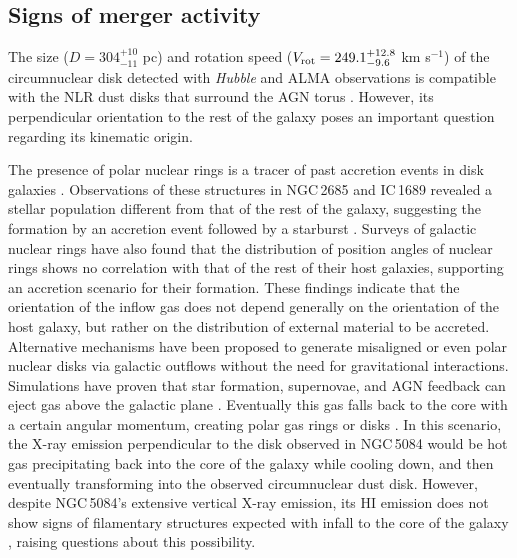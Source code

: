 \documentclass[modern]{CORE-AAS/aastex631}
\begin{document}
\subsection{Signs of merger activity}
\label{subsec:discussion_merger}
The size ($D=304^{+10}_{-11}$ pc) and rotation speed ($V_{\rm rot} = 249.1^{+12.8}_{-9.6}$ km s$^{-1}$) of the circumnuclear disk detected with \emph{Hubble} and ALMA observations is compatible with the NLR dust disks that surround the AGN torus \citep[][]{ramosalmeida+2017nat1_679}. However, its perpendicular orientation to the rest of the galaxy poses an important question regarding its kinematic origin. \par 
{}
The presence of polar nuclear rings is a tracer of past accretion events in disk galaxies \citep{anantharamaiah+1996apj466_13}. Observations of these structures in NGC\,2685 and IC\,1689 revealed a stellar population different from that of the rest of the galaxy, suggesting the formation by an accretion event followed by a starburst \citep{silchenko1998aap330_412}. Surveys of galactic nuclear rings \citep{comeron+2010mnras402_2462} have also found that the distribution of position angles of nuclear rings shows no correlation with that of the rest of their host galaxies, supporting an accretion scenario for their formation. These findings indicate that the orientation of the inflow gas does not depend generally on the orientation of the host galaxy, but rather on the distribution of external material to be accreted. 
Alternative mechanisms have been proposed to generate misaligned or even polar nuclear disks via galactic outflows without the need for gravitational interactions. Simulations have proven that star formation, supernovae, and AGN feedback can eject gas above the galactic plane \citep{emsellem+2015mnras446_2468, renaud+2015mnras454_3299}. Eventually this gas falls back to the core with a certain angular momentum, creating polar gas rings or disks \citep{combes2017inproceedings_Di}. In this scenario, the X-ray emission perpendicular to the disk observed in NGC\,5084 would be hot gas precipitating back into the core of the galaxy while cooling down, and then eventually transforming into the observed circumnuclear dust disk. However, despite NGC\,5084's extensive vertical X-ray emission, its HI emission does not show signs of filamentary structures expected with infall to the core of the galaxy  \citep{zheng+2022afz22_085004}, raising questions about this possibility.
\end{document}
